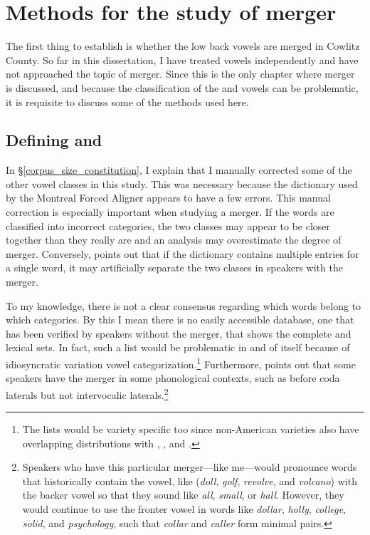 \section{Methods for the study of merger}
\label{low_back_merger_methods}

The first thing to establish is whether the low back vowels are merged in Cowlitz County. So far in this dissertation, I have treated vowels independently and have not approached the topic of merger. Since this is the only chapter where merger is discussed, and because the classification of the \lot and \thought vowels can be problematic, it is requisite to discuss some of the methods used here.

\subsection{Defining \lot and \thought}

In \S\ref{corpus_size_constitution}, I explain that I manually corrected some of the other vowel classes in this study. This was necessary because the dictionary used by the Montreal Forced Aligner appears to have a few errors. This manual correction is especially important when studying a merger. If the words are classified into incorrect categories, the two classes may appear to be closer together than they really are and an analysis may overestimate the degree of merger. Conversely, \citet[39]{strelluf_2019} points out that if the dictionary contains multiple entries for a single word, it may artificially separate the two classes in speakers with the merger.

To my knowledge, there is not a clear consensus regarding which words belong to which categories. By this I mean there is no easily accessible database, one that has been verified by speakers without the merger, that shows the complete \lot and \thought lexical sets. In fact, such a list would be problematic in and of itself because of idiosyncratic variation vowel categorization.\footnote{The lists would be variety specific too since non-American varieties also have overlapping distributions with \palm, \cloth, and \bath \citep{wells_1982}.} Furthermore, \citet{dinkin_2016} points out that some speakers have the merger in some phonological contexts, such as before coda laterals but not intervocalic laterals.\footnote{Speakers who have this particular merger---like me---would pronounce words that historically contain the \lot vowel, like (\textit{doll}, \textit{golf}, \textit{revolve}, and \textit{volcano}) with the backer \thought vowel so that they sound like \textit{all}, \textit{small}, or \textit{hall}. However, they would continue to use the fronter vowel in words like \textit{dollar}, \textit{holly}, \textit{college}, \textit{solid}, and \textit{psychology}, such that \textit{collar} and \textit{caller} form minimal pairs.}

